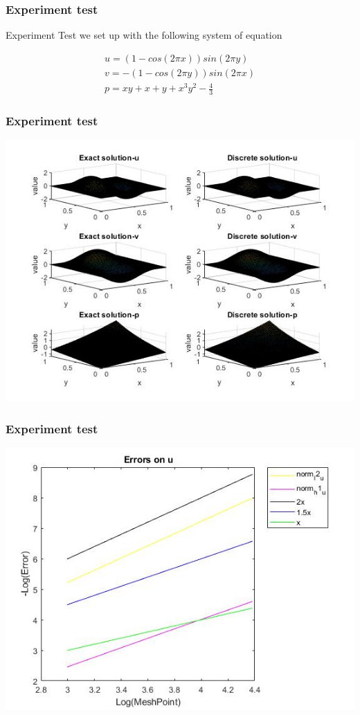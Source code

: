 \documentclass[11pt]{beamer}
\numberwithin{equation}{section}
\theoremstyle{plain}
\theoremstyle{definition}
\theoremstyle{remark}
\begin{document}
\begin{frame}\frametitle{Experiment test}
Experiment Test we set up with the following system of equation 

\begin{align*}
u=(1-cos(2\pi x))sin(2 \pi y) \\
v=-(1-cos(2\pi y))sin(2 \pi x) \\
p=xy+x+y+x^3y^2-\frac{4}{3}
\end{align*}
\end{frame}
\begin{frame}\frametitle{Experiment test}
\begin{center}
\includegraphics[scale=0.45]{2}
\end{center}
\end{frame}
\begin{frame}\frametitle{Experiment test}
\includegraphics[scale=0.5]{3}
\end{frame}
\end{document}
